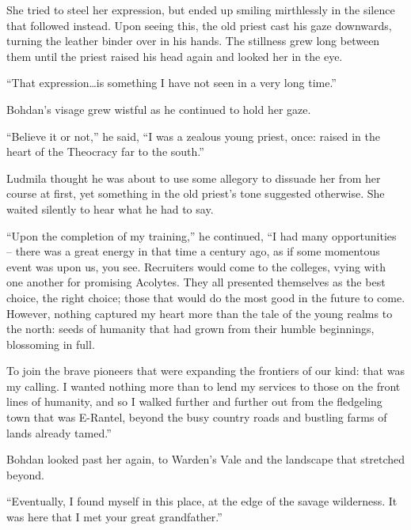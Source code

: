  

She tried to steel her expression, but ended up smiling mirthlessly in the silence that followed instead. Upon seeing this, the old priest cast his gaze downwards, turning the leather binder over in his hands. The stillness grew long between them until the priest raised his head again and looked her in the eye.

 

“That expression…is something I have not seen in a very long time.”

 

Bohdan's visage grew wistful as he continued to hold her gaze.

 

“Believe it or not,” he said, “I was a zealous young priest, once: raised in the heart of the Theocracy far to the south.”

 

Ludmila thought he was about to use some allegory to dissuade her from her course at first, yet something in the old priest's tone suggested otherwise. She waited silently to hear what he had to say.

 

“Upon the completion of my training,” he continued, “I had many opportunities – there was a great energy in that time a century ago, as if some momentous event was upon us, you see. Recruiters would come to the colleges, vying with one another for promising Acolytes. They all presented themselves as the best choice, the right choice; those that would do the most good in the future to come. However, nothing captured my heart more than the tale of the young realms to the north: seeds of humanity that had grown from their humble beginnings, blossoming in full.

 

To join the brave pioneers that were expanding the frontiers of our kind: that was my calling. I wanted nothing more than to lend my services to those on the front lines of humanity, and so I walked further and further out from the fledgeling town that was E-Rantel, beyond the busy country roads and bustling farms of lands already tamed.”

 

Bohdan looked past her again, to Warden’s Vale and the landscape that stretched beyond.

 

“Eventually, I found myself in this place, at the edge of the savage wilderness. It was here that I met your great grandfather.”

